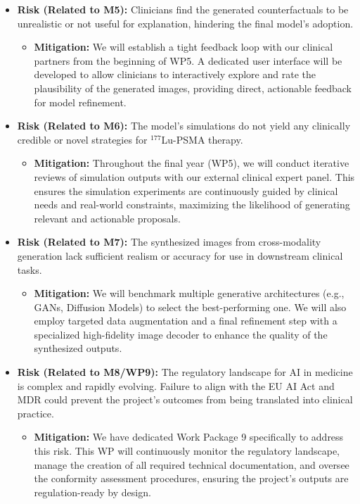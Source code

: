 \documentclass[11pt, a4paper]{article}
\begin{document}
\begin{itemize}
\begin{itemize}
    \end{itemize}
    \item \textbf{Risk (Related to M5):} Clinicians find the generated counterfactuals to be unrealistic or not useful for explanation, hindering the final model's adoption.
    \begin{itemize}
        \item \textbf{Mitigation:} We will establish a tight feedback loop with our clinical partners from the beginning of WP5. A dedicated user interface will be developed to allow clinicians to interactively explore and rate the plausibility of the generated images, providing direct, actionable feedback for model refinement.
    \end{itemize}
    \item \textbf{Risk (Related to M6):} The model's simulations do not yield any clinically credible or novel strategies for $^{177}$Lu-PSMA therapy.
    \begin{itemize}
        \item \textbf{Mitigation:} Throughout the final year (WP5), we will conduct iterative reviews of simulation outputs with our external clinical expert panel. This ensures the simulation experiments are continuously guided by clinical needs and real-world constraints, maximizing the likelihood of generating relevant and actionable proposals.
    \end{itemize}
    \item \textbf{Risk (Related to M7):} The synthesized images from cross-modality generation lack sufficient realism or accuracy for use in downstream clinical tasks.
    \begin{itemize}
        \item \textbf{Mitigation:} We will benchmark multiple generative architectures (e.g., GANs, Diffusion Models) to select the best-performing one. We will also employ targeted data augmentation and a final refinement step with a specialized high-fidelity image decoder to enhance the quality of the synthesized outputs.
    \end{itemize}
    \item \textbf{Risk (Related to M8/WP9):} The regulatory landscape for AI in medicine is complex and rapidly evolving. Failure to align with the EU AI Act and MDR could prevent the project's outcomes from being translated into clinical practice.
    \begin{itemize}
        \item \textbf{Mitigation:} We have dedicated Work Package 9 specifically to address this risk. This WP will continuously monitor the regulatory landscape, manage the creation of all required technical documentation, and oversee the conformity assessment procedures, ensuring the project's outputs are regulation-ready by design.
    \end{itemize}
\end{itemize}
\end{document}
